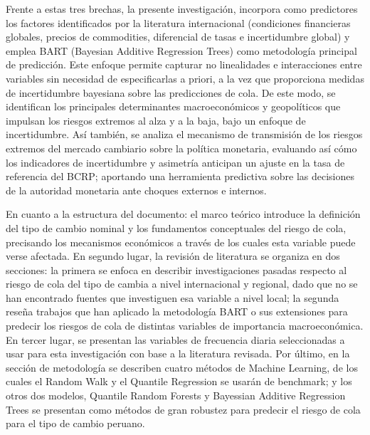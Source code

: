 ﻿\documentclass[11pt,a4paper]{article}
\begin{document}
Frente a estas tres brechas, la presente investigación, incorpora como predictores los factores identificados por la literatura internacional (condiciones financieras globales, precios de commodities, diferencial de tasas e incertidumbre global) y emplea BART (Bayesian Additive Regression Trees) como metodología principal de predicción. Este enfoque permite capturar no linealidades e interacciones entre variables sin necesidad de especificarlas a priori, a la vez que proporciona medidas de incertidumbre bayesiana sobre las predicciones de cola. De este modo, se identifican los principales determinantes macroeconómicos y geopolíticos que impulsan los riesgos extremos al alza y a la baja, bajo un enfoque de incertidumbre. Así también, se analiza el mecanismo de transmisión de los riesgos extremos del mercado cambiario sobre la política monetaria, evaluando así cómo los indicadores de incertidumbre y asimetría anticipan un ajuste en la tasa de referencia del BCRP; aportando una herramienta predictiva sobre las decisiones de la autoridad monetaria ante choques externos e internos.

En cuanto a la estructura del documento: el marco teórico introduce la definición del tipo de cambio nominal y los fundamentos conceptuales del riesgo de cola, precisando los mecanismos económicos a través de los cuales esta variable puede verse afectada. En segundo lugar, la revisión de literatura se organiza en dos secciones: la primera se enfoca en describir investigaciones pasadas respecto al riesgo de cola del tipo de cambia a nivel internacional y regional, dado que no se han encontrado fuentes que investiguen esa variable a nivel local; la segunda reseña trabajos que han aplicado la metodología BART o sus extensiones para predecir los riesgos de cola de distintas variables de importancia macroeconómica. En tercer lugar, se presentan las variables de frecuencia diaria seleccionadas a usar para esta investigación con base a la literatura revisada. Por último, en la sección de metodología se describen cuatro métodos de Machine Learning, de los cuales el Random Walk y el Quantile Regression se usarán de benchmark; y los otros dos modelos, Quantile Random Forests y Bayessian Additive Regression Trees se presentan como métodos de gran robustez para predecir el riesgo de cola para el tipo de cambio peruano.   




\end{document}
